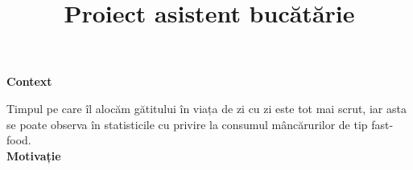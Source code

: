\documentclass[a4paper]{article}
\title{Proiect asistent bucătărie}
\date{}
\begin{document}
\maketitle

\large
\textbf{Context}\\
\normalsize

Timpul pe care îl alocăm gătitului în viața de zi cu zi este tot mai scrut, iar asta se poate observa în statisticile cu privire la consumul mâncărurilor de tip fast-food.\cite{1}
\\

\large
\textbf{Motivație}\\
\normalsize

\printbibliography
\end{document}
